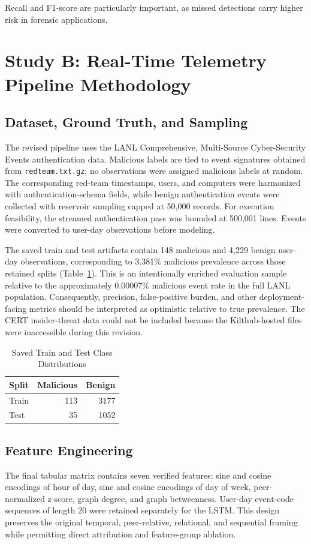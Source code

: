 Recall and F1-score are particularly important, as missed detections carry higher risk in forensic applications.




\section{Study B: Real-Time Telemetry Pipeline Methodology}

\subsection{Dataset, Ground Truth, and Sampling}
The revised pipeline uses the LANL Comprehensive, Multi-Source Cyber-Security Events authentication data. Malicious labels are tied to event signatures obtained from \texttt{redteam.txt.gz}; no observations were assigned malicious labels at random. The corresponding red-team timestamps, users, and computers were harmonized with authentication-schema fields, while benign authentication events were collected with reservoir sampling capped at 50,000 records. For execution feasibility, the streamed authentication pass was bounded at 500,001 lines. Events were converted to user-day observations before modeling.

The saved train and test artifacts contain 148 malicious and 4,229 benign user-day observations, corresponding to 3.381\% malicious prevalence across those retained splits (Table~\ref{tab:split_counts}). This is an intentionally enriched evaluation sample relative to the approximately 0.00007\% malicious event rate in the full LANL population. Consequently, precision, false-positive burden, and other deployment-facing metrics should be interpreted as optimistic relative to true prevalence. The CERT insider-threat data could not be included because the Kilthub-hosted files were inaccessible during this revision.

\begin{table}[!htbp]
\caption{Saved Train and Test Class Distributions}
\label{tab:split_counts}
\centering
\begin{tabular}{lrr}
\toprule
Split & Malicious & Benign \\
\midrule
Train & 113 & 3177 \\
Test & 35 & 1052 \\
\bottomrule
\end{tabular}
\end{table}

\subsection{Feature Engineering}
The final tabular matrix contains seven verified features: sine and cosine encodings of hour of day, sine and cosine encodings of day of week, peer-normalized z-score, graph degree, and graph betweenness. User-day event-code sequences of length 20 were retained separately for the LSTM. This design preserves the original temporal, peer-relative, relational, and sequential framing while permitting direct attribution and feature-group ablation.

